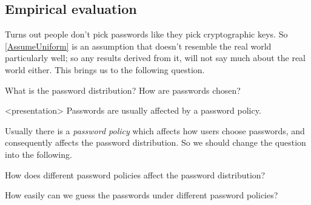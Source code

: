 \subsection{Empirical evaluation}

Turns out people don't pick passwords like they pick cryptographic keys.
So \cref{AssumeUniform} is an assumption that doesn't resemble the real world 
particularly well; so any results derived from it, will not say much about the 
real world either.
This brings us to the following question.

\begin{frame}
\begin{question}\label{PasswordDistribution}
  What is the password distribution?
  How are passwords chosen?
\end{question}

\pause

\begin{solution}<presentation>
  Passwords are usually affected by a password policy.
\end{solution}
\end{frame}

Usually there is a \emph{password policy} which affects how users choose 
passwords, and consequently affects the password distribution.
So we should change the question into the following.

\begin{frame}
\begin{question}
  How does different password policies affect the password distribution?
\end{question}
\begin{question}\label{Guessability}
  How easily can we guess the passwords under different password policies?
\end{question}
\end{frame}

